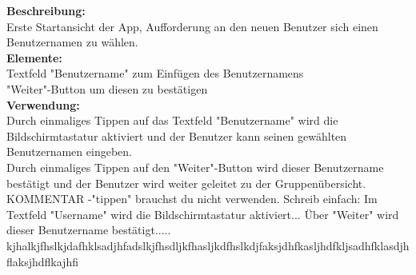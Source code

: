 \textbf{Beschreibung:}\\
Erste Startansicht der App, Aufforderung an den neuen Benutzer sich einen Benutzernamen zu wählen.\\
\textbf{Elemente:}\\
Textfeld "Benutzername" zum Einfügen des Benutzernamens\\
"Weiter"-Button um diesen zu bestätigen\\
\textbf{Verwendung:}\\
Durch einmaliges Tippen auf das Textfeld "Benutzername" wird die Bildschirmtastatur aktiviert und der Benutzer kann seinen gewählten Benutzernamen eingeben.\\
Durch einmaliges Tippen auf den "Weiter"-Button wird dieser Benutzername bestätigt und der Benutzer wird weiter geleitet zu der Gruppenübersicht.
\\
KOMMENTAR
-"tippen" brauchst du nicht verwenden. Schreib einfach: Im Textfeld "Username" wird die Bildschirmtastatur aktiviert...
Über "Weiter"  wird dieser Benutzername bestätigt..... 
kjhalkjfhslkjdafhklsadjhfadslkjfhsdljkfhasljkdfhslkdjfaksjdhfkasljhdfkljsadhfklasdjhflaksjhdflkajhfi
\newpage

